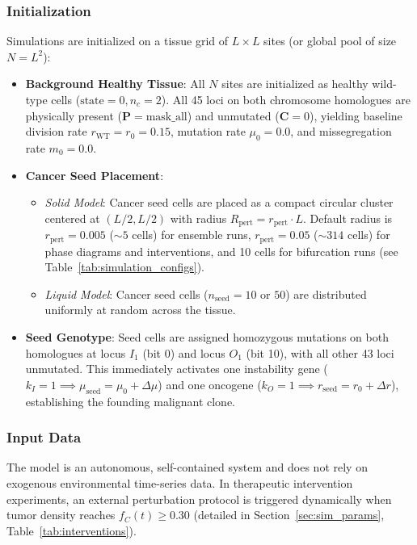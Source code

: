 \documentclass[11pt,a4paper]{article}
\begin{document}
\subsubsection{Initialization}
Simulations are initialized on a tissue grid of $L \times L$ sites (or global pool of size $N = L^2$):
\begin{itemize}
    \item \textbf{Background Healthy Tissue}: All $N$ sites are initialized as healthy wild-type cells ($\text{state} = 0, n_c = 2$). All 45 loci on both chromosome homologues are physically present ($\mathbf{P} = \text{mask\_all}$) and unmutated ($\mathbf{C} = 0$), yielding baseline division rate $r_{\text{WT}} = r_0 = 0.15$, mutation rate $\mu_0 = 0.0$, and missegregation rate $m_0 = 0.0$.
    \item \textbf{Cancer Seed Placement}:
    \begin{itemize}
        \item \textit{Solid Model}: Cancer seed cells are placed as a compact circular cluster centered at $(L/2, L/2)$ with radius $R_{\text{pert}} = r_{\text{pert}} \cdot L$. Default radius is $r_{\text{pert}} = 0.005$ ($\sim 5$ cells) for ensemble runs, $r_{\text{pert}} = 0.05$ ($\sim 314$ cells) for phase diagrams and interventions, and 10 cells for bifurcation runs (see Table~\ref{tab:simulation_configs}).
        \item \textit{Liquid Model}: Cancer seed cells ($n_{\text{seed}} = 10$ or $50$) are distributed uniformly at random across the tissue.
    \end{itemize}
    \item \textbf{Seed Genotype}: Seed cells are assigned homozygous mutations on both homologues at locus $I_1$ (bit 0) and locus $O_1$ (bit 10), with all other 43 loci unmutated. This immediately activates one instability gene ($k_I = 1 \implies \mu_{\text{seed}} = \mu_0 + \Delta\mu$) and one oncogene ($k_O = 1 \implies r_{\text{seed}} = r_0 + \Delta r$), establishing the founding malignant clone.
\end{itemize}

\subsubsection{Input Data}
The model is an autonomous, self-contained system and does not rely on exogenous environmental time-series data. In therapeutic intervention experiments, an external perturbation protocol is triggered dynamically when tumor density reaches $f_C(t) \ge 0.30$ (detailed in Section~\ref{sec:sim_params}, Table~\ref{tab:interventions}).
\end{document}
